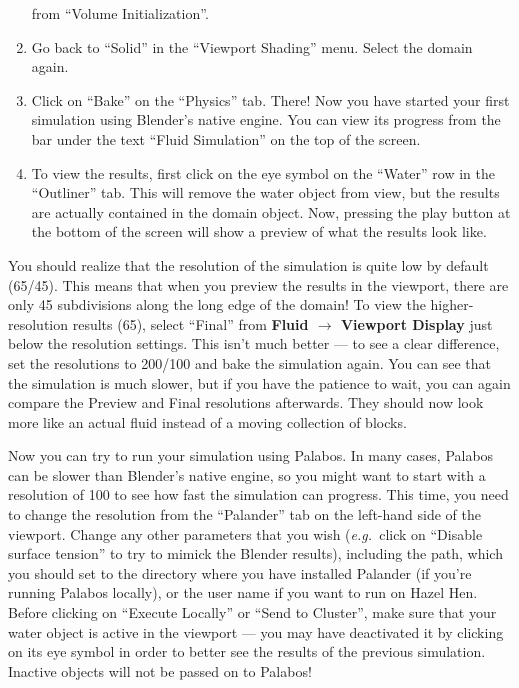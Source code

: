 \documentclass[12pt]{article}
\newcommand{\eg}{\emph{e.g.\ }}
\begin{document}
\begin{enumerate}
from ``Volume Initialization''.
\item Go back to ``Solid'' in the ``Viewport Shading'' menu. Select the domain again.
\item Click on ``Bake'' on the ``Physics'' tab. There! Now you have started your first simulation using 
Blender's native engine. You can view its progress from the bar under the text ``Fluid Simulation'' on the 
top of the screen.
\item To view the results, first click on the eye symbol on the ``Water'' row in the ``Outliner'' tab. This 
will remove the water object from view, but the results are actually contained in the domain object. Now, 
pressing the play button at the bottom of the screen will show a preview of what the results look like.
\end{enumerate}

You should realize that the resolution of the simulation is quite low by default (65/45). This means that 
when you preview the results in the viewport, there are only 45 subdivisions along the long edge of the 
domain! To view the higher-resolution results (65), select ``Final'' from {\bf Fluid $\to$ Viewport Display} 
just below the resolution settings. This isn't much better --- to see a clear difference, set the resolutions 
to 200/100 and bake the simulation again. You can see that the simulation is much slower, but if you have the 
patience to wait, you can again compare the Preview and Final resolutions afterwards. They should now look 
more like an actual fluid instead of a moving collection of blocks.

Now you can try to run your simulation using Palabos. In many cases, Palabos can be slower than Blender's 
native engine, so you might want to start with a resolution of 100 to see how fast the simulation can 
progress. This time, you need to change the resolution from the ``Palander'' tab on the left-hand side of the 
viewport. Change any other parameters that you wish (\eg click on ``Disable surface tension'' to try to 
mimick the Blender results), including the path, which you should set to the directory where you have 
installed Palander (if you're running Palabos locally), or the user name if you want to run on Hazel Hen. 
Before clicking on ``Execute Locally'' or ``Send to Cluster'', make sure that your water object is active in 
the viewport --- you may have deactivated it by clicking on its eye symbol in order to better see the results 
of the previous simulation. Inactive objects will not be passed on to Palabos!
\end{document}
